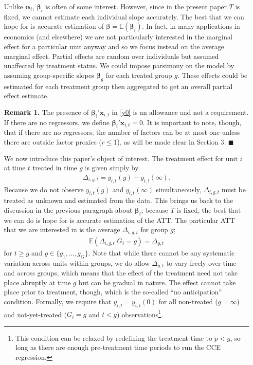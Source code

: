 \documentclass[12pt,fleqn]{article}
\def\*#1{\mathbf{#1}}
\def\+#1{\boldsymbol{#1}}
\begin{document}
Unlike $\+\alpha_i$, $\+\beta_i$ is often of some interest. However, since in the present paper $T$ is fixed, we cannot estimate each individual slope accurately. The best that we can hope for is accurate estimation of $\+\beta = \mathbb{E}(\+\beta_i)$. In fact, in many applications in economics (and elsewhere) we are not particularly interested in the marginal effect for a particular unit anyway and so we focus instead on the average marginal effect. Partial effects are random over individuals but assumed unaffected by treatment status. We could impose parsimony on the model by assuming group-specific slopes $\+\beta_g$ for each treated group $g$. These effects could be estimated for each treatment group then aggregated to get an overall partial effect estimate.

\bigskip

\noindent \textbf{Remark 1.} The presence of $\+\beta_i'\*x_{i,t}$ in \eqref{y0} is an allowance and not a requirement. If there are no regressors, we define $\+\beta_i'\*x_{i,t} = 0$. It is important to note, though, that if there are no regressors, the number of factors can be at most one unless there are outside factor proxies ($r \leq 1$), as will be made clear in Section 3. $\blacksquare$

\bigskip

We now introduce this paper's object of interest. The treatment effect for unit $i$ at time $t$ treated in time $g$ is given simply by
\begin{align}
\Delta_{i,g,t} = y_{i,t}(g) - y_{i,t}(\infty) . \label{te}
\end{align}
Because we do not observe $y_{i,t}(g)$ and $y_{i,t}(\infty)$ simultaneously, $\Delta_{i,g,t}$ must be treated as unknown and estimated from the data. This brings us back to the discussion in the previous paragraph about $\+\beta_i$; because $T$ is fixed, the best that we can do is hope for is accurate estimation of the ATT. The particular ATT that we are interested in is the average $\Delta_{i,g,t}$ for group $g$;
\begin{align}
\mathbb{E}(\Delta_{i,g,t}| G_i = g ) = \Delta_{g,t} \label{att}
\end{align}
for $t \geq g$ and $g \in \{g_1,...,g_G\}$. Note that while there cannot be any systematic variation across units within groups, we do allow $\Delta_{g,t}$ to vary freely over time and across groups, which means that the effect of the treatment need not take place abruptly at time $g$ but can be gradual in nature. The effect cannot take place prior to treatment, though, which is the so-called ``no anticipation'' condition. Formally, we require that $y_{i,t} = y_{i,t}(0)$ for all non-treated ($g = \infty$) and not-yet-treated ($G_i = g$ and $t < g$) observations\footnote{This condition can be relaxed by redefining the treatment time to $p < g$, so long as there are enough pre-treatment time periods to run the CCE regression.}. 
\end{document}
